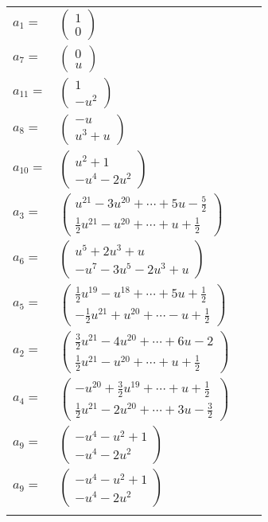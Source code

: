 \documentclass[1p]{elsarticle_modified}
\theoremstyle{definition}
\begin{document}
\begin{tabular}{m{7pt} m{180pt} m{7pt} m{180pt} }
\flushright $a_{1}=$&$\begin{pmatrix}1\\0\end{pmatrix}$ \\
\flushright $a_{7}=$&$\begin{pmatrix}0\\u\end{pmatrix}$ \\
\flushright $a_{11}=$&$\begin{pmatrix}1\\- u^2\end{pmatrix}$ \\
\flushright $a_{8}=$&$\begin{pmatrix}- u\\u^3+u\end{pmatrix}$ \\
\flushright $a_{10}=$&$\begin{pmatrix}u^2+1\\- u^4-2 u^2\end{pmatrix}$ \\
\flushright $a_{3}=$&$\begin{pmatrix}u^{21}-3 u^{20}+\cdots+5 u-\frac{5}{2}\\\frac{1}{2} u^{21}- u^{20}+\cdots+u+\frac{1}{2}\end{pmatrix}$ \\
\flushright $a_{6}=$&$\begin{pmatrix}u^5+2 u^3+u\\- u^7-3 u^5-2 u^3+u\end{pmatrix}$ \\
\flushright $a_{5}=$&$\begin{pmatrix}\frac{1}{2} u^{19}- u^{18}+\cdots+5 u+\frac{1}{2}\\-\frac{1}{2} u^{21}+u^{20}+\cdots- u+\frac{1}{2}\end{pmatrix}$ \\
\flushright $a_{2}=$&$\begin{pmatrix}\frac{3}{2} u^{21}-4 u^{20}+\cdots+6 u-2\\\frac{1}{2} u^{21}- u^{20}+\cdots+u+\frac{1}{2}\end{pmatrix}$ \\
\flushright $a_{4}=$&$\begin{pmatrix}- u^{20}+\frac{3}{2} u^{19}+\cdots+u+\frac{1}{2}\\\frac{1}{2} u^{21}-2 u^{20}+\cdots+3 u-\frac{3}{2}\end{pmatrix}$ \\
\flushright $a_{9}=$&$\begin{pmatrix}- u^4- u^2+1\\- u^4-2 u^2\end{pmatrix}$\\ \flushright $a_{9}=$&$\begin{pmatrix}- u^4- u^2+1\\- u^4-2 u^2\end{pmatrix}$\\&\end{tabular}
\end{document}
